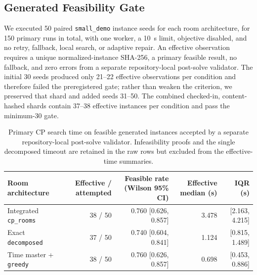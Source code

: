 \subsection{Generated Feasibility Gate}
We executed 50 paired \texttt{small\_demo} instance seeds for each room architecture, for 150 primary runs in total, with one worker, a 10~s limit, objective disabled, and no retry, fallback, local search, or adaptive repair.
An effective observation requires a unique normalized-instance SHA-256, a primary feasible result, no fallback, and zero errors from a separate repository-local post-solve validator.
The initial 30 seeds produced only 21--22 effective observations per condition and therefore failed the preregistered gate; rather than weaken the criterion, we preserved that shard and added seeds 31--50.
The combined checked-in, content-hashed shards contain 37--38 effective instances per condition and pass the minimum-30 gate.

\begin{table}[t]
\centering
\footnotesize
\begin{tabular}{lrrrr}
\toprule
Room architecture & Effective / attempted & Feasible rate (Wilson 95\% CI) & Effective median (s) & IQR (s) \\
\midrule
Integrated \texttt{cp\_rooms} & 38 / 50 & 0.760 [0.626, 0.857] & 3.478 & [2.163, 4.215] \\
Exact \texttt{decomposed} & 37 / 50 & 0.740 [0.604, 0.841] & 1.124 & [0.815, 1.489] \\
Time master + \texttt{greedy} & 38 / 50 & 0.760 [0.626, 0.857] & 0.698 & [0.453, 0.886] \\
\bottomrule
\end{tabular}
\caption{Primary CP search time on feasible generated instances accepted by a separate repository-local post-solve validator. Infeasibility proofs and the single decomposed timeout are retained in the raw rows but excluded from the effective-time summaries.}\label{tab:generated-feasibility}
\end{table}

